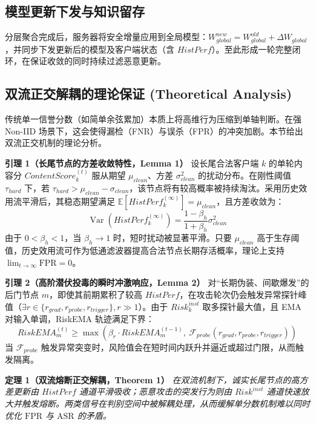 \documentclass[11pt, a4paper, UTF8, fontset=fandol]{ctexart}
\begin{document}
\subsection{模型更新下发与知识留存}
分层聚合完成后，服务器将安全增量应用到全局模型：$W_{global}^{new} = W_{global}^{old} + \Delta W_{global}$，并同步下发更新后的模型及客户端状态（含 $HistPerf$）。至此形成一轮完整闭环，在保证收敛的同时持续过滤恶意更新。

\subsection{双流正交解耦的理论保证 (Theoretical Analysis)}
传统单一信誉分数（如简单余弦累加）本质上将高维行为压缩到单轴判断。在强 Non-IID 场景下，这会使得漏检（FNR）与误杀（FPR）的冲突加剧。本节给出双流正交机制的理论分析。

\textbf{引理 1（长尾节点的方差收敛特性，Lemma 1）}
设长尾合法客户端 $k$ 的单轮内容分 $ContentScore_{k}^{(t)}$ 服从期望 $\mu_{clean}$、方差 $\sigma_{clean}^2$ 的扰动分布。在刚性阈值 $\tau_{hard}$ 下，若 $\tau_{hard} > \mu_{clean} - \sigma_{clean}$，该节点将有较高概率被持续淘汰。采用历史效用流平滑后，其稳态期望满足 $\mathbb{E}[HistPerf_k^{(\infty)}] = \mu_{clean}$，且方差收敛为：
\begin{equation}
    \operatorname{Var}(HistPerf_{k}^{(\infty)}) = \frac{1-\beta_h}{1+\beta_h} \sigma_{clean}^{2}
\end{equation}
由于 $0 < \beta_h < 1$，当 $\beta_h \to 1$ 时，短时扰动被显著平滑。只要 $\mu_{clean}$ 高于生存阈值，历史效用流可作为低通滤波器提高合法节点长期存活概率，理论上支持 $\lim_{t \to \infty} \text{FPR} = 0$。

\textbf{引理 2（高阶潜伏投毒的瞬时冲激响应，Lemma 2）}
对“长期伪装、间歇爆发”的后门节点 $m$，即使其前期累积了较高 $HistPerf$，在攻击轮次仍会触发异常探针峰值（$\exists r \in \{r_{grad}, r_{probe}, r_{trigger}\}, r \gg 1$）。由于 $Risk_k^{inst}$ 取多探针最大值，且 EMA 对输入单调，RiskEMA 轨迹满足下界：
\begin{equation}
    RiskEMA_m^{(t)} \ge \max \left( \beta_r \cdot RiskEMA_m^{(t-1)},\ \mathcal{F}_{probe}(r_{grad}, r_{probe}, r_{trigger}) \right)
\end{equation}
当 $\mathcal{F}_{probe}$ 触发异常突变时，风险值会在短时间内跃升并逼近或超过门限，从而触发隔离。

\textbf{定理 1（双流熔断正交解耦，Theorem 1）}
\textit{在双流机制下，诚实长尾节点的高方差更新由 $HistPerf$ 通道平滑吸收；恶意攻击的突发行为则由 $Risk^{inst}$ 通道快速放大并触发熔断。两类信号在判别空间中被解耦处理，从而缓解单分数机制难以同时优化 $\text{FPR}$ 与 $\text{ASR}$ 的矛盾。}
\end{document}
